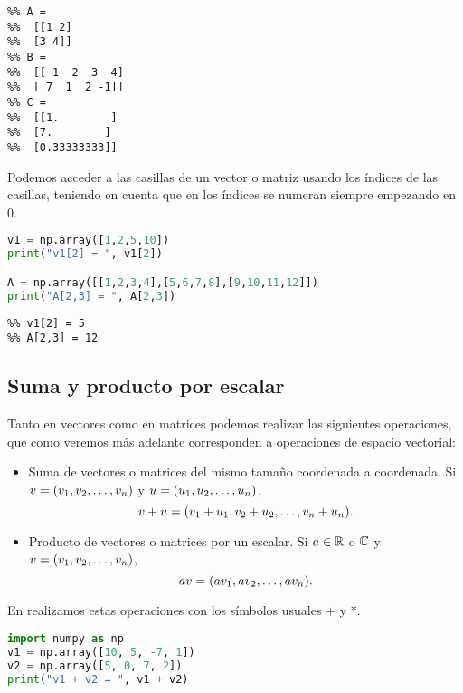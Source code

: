 \begin{verbatim}
%% A =
%%  [[1 2]
%%  [3 4]]
%% B =
%%  [[ 1  2  3  4]
%%  [ 7  1  2 -1]]
%% C =
%%  [[1.        ]
%%  [7.        ]
%%  [0.33333333]]
\end{verbatim}

Podemos acceder a las casillas de un vector o matriz usando los índices de las casillas,
teniendo en cuenta que en \python los índices se numeran siempre empezando en 0.

\begin{Shaded}
\begin{lstlisting}[language=python]
v1 = np.array([1,2,5,10])
print("v1[2] = ", v1[2])

A = np.array([[1,2,3,4],[5,6,7,8],[9,10,11,12]])
print("A[2,3] = ", A[2,3])
\end{lstlisting}
\end{Shaded}

\begin{verbatim}
%% v1[2] = 5
%% A[2,3] = 12
\end{verbatim}

\subsection{Suma y producto por escalar}
Tanto en vectores como en matrices podemos realizar las siguientes operaciones, que como veremos m\'as adelante corresponden a operaciones de espacio vectorial:

\begin{itemize}
\item Suma de vectores o matrices del mismo tamaño coordenada a coordenada.
Si $\vb = (v_1, v_2, \dots, v_n)$ y $\ub = (u_1, u_2, \dots, u_n)$,
$$
\vb + \ub = (v_1 + u_1, v_2 + u_2, \dots, v_n + u_n).
$$

\item Producto de vectores o matrices por un escalar.
Si $a \in \mathbb R$ o $\mathbb C$ y $\vb = (v_1, v_2, \dots, v_n)$,
$$
a \vb = (av_1, av_2, \dots, av_n).
$$

\end{itemize}

En \python realizamos estas operaciones con los símbolos usuales $+$ y $*$.
\begin{Shaded}
\begin{lstlisting}[language=python]
import numpy as np
v1 = np.array([10, 5, -7, 1])
v2 = np.array([5, 0, 7, 2])
print("v1 + v2 = ", v1 + v2)
\end{lstlisting}
\end{Shaded}

